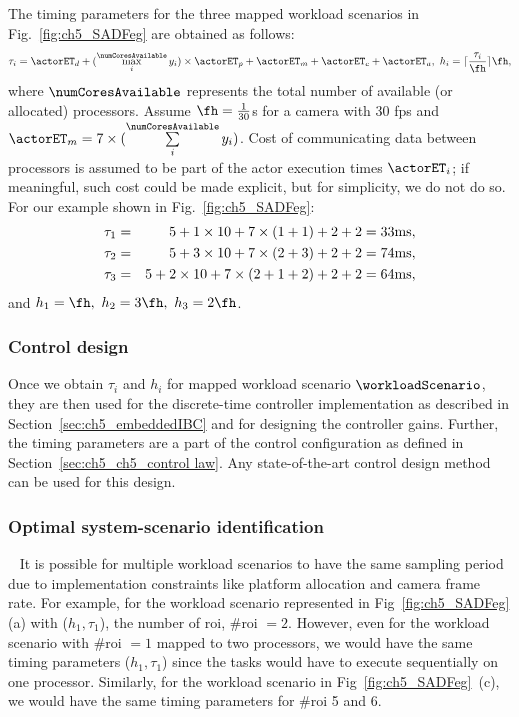 The timing parameters for the three mapped workload scenarios in Fig.~\ref{fig:ch5_SADFeg} are obtained as follows: 
\begin{eqnarray}
\tau_i = \actorET_d+(\max\limits_i^{\numCoresAvailable} y_i)\times \actorET_p+\actorET_m+\actorET_c+\actorET_a,\ h_i= \lceil \frac{\tau_i}{\fh}\rceil \fh,\nonumber
\end{eqnarray}
 where ${\numCoresAvailable}$ represents the total number of available (or allocated) processors. Assume $\fh=\frac{1}{30}$s for a camera with 30 fps and $\actorET_m=7\times(\sum\limits_i^{\numCoresAvailable} y_i)$. Cost of communicating data between processors is assumed to be part of the actor execution times $\actorET_i$; if meaningful, such cost could be made explicit, but for simplicity, we do not do so. For our example shown in Fig.~\ref{fig:ch5_SADFeg}:
\begin{eqnarray}
\noindent\tau_1 &=& 5+1\times10+7\times (1+1)+2+2=33 \text{ms},\nonumber\\
\tau_2 &=& 5+3\times10+7\times (2+3)+2+2=74 \text{ms},\nonumber\\
\tau_3 &=& 5+2\times10+7\times(2+1+2)+2+2=64 \text{ms},\nonumber
\end{eqnarray}
and $h_1=\fh,\ h_2=3\fh,\ h_3=2\fh$. 

\subsubsection{Control design}
Once we obtain $\tau_{i}$ and $h_{i}$ for mapped workload scenario $\workloadScenario$, they are then used for the discrete-time controller implementation as described in Section~\ref{sec:ch5_embeddedIBC} and for designing the controller gains. Further, the timing parameters are a part of the control configuration as defined in Section~\ref{sec:ch5_ch5_control law}. Any  state-of-the-art control design method can be used for this design. 

\subsubsection{Optimal system-scenario identification}~\label{sec:ch5_ch5_sys_scenario}
It is possible for multiple workload scenarios to have the same sampling period due to implementation constraints like platform allocation and camera frame rate. For example, for the workload scenario represented in Fig~\ref{fig:ch5_SADFeg} (a) with ($h_1,\tau_1$), the number of \gls{roi}, \#\gls{roi} $=2$. However, even for the workload scenario with \#\gls{roi} $=1$ mapped to two processors, we would have the same timing parameters ($h_1,\tau_1$) since the tasks would have to execute sequentially on one processor. Similarly, for the workload scenario in Fig~\ref{fig:ch5_SADFeg}~(c), we would have the same timing parameters for \#\gls{roi} 5 and 6.

